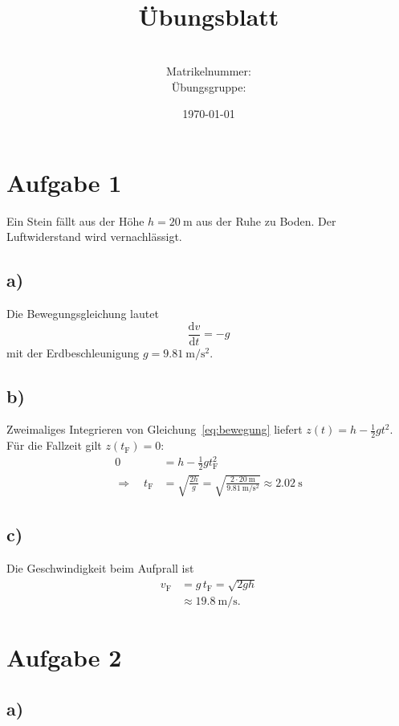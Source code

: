 \documentclass[a4paper,11pt]{article}
\title{\vorlesung\\[0.3em] \large Übungsblatt \blatt}
\author{\name \\ Matrikelnummer: \matrikel \\ Übungsgruppe: \gruppe}
\date{\today}
\newcommand{\diff}{\mathrm{d}}                    %
\newcommand{\abl}[2]{\frac{\diff #1}{\diff #2}}   %
\begin{document}
\maketitle
\thispagestyle{fancy}

\section*{Aufgabe 1}
Ein Stein fällt aus der Höhe $h = \qty{20}{\metre}$ aus der Ruhe zu Boden.
Der Luftwiderstand wird vernachlässigt.

\subsection*{a)}
Die Bewegungsgleichung lautet
\begin{equation}
  \abl{v}{t} = -g
  \label{eq:bewegung}
\end{equation}
mit der Erdbeschleunigung $g = \qty{9.81}{\metre\per\second\squared}$.

\subsection*{b)}
Zweimaliges Integrieren von Gleichung~\eqref{eq:bewegung} liefert
$z(t) = h - \frac{1}{2} g t^2$. Für die Fallzeit gilt $z(t_\text{F}) = 0$:
\begin{align}
  0 &= h - \frac{1}{2} g t_\text{F}^2 \\
  \Rightarrow \quad t_\text{F} &= \sqrt{\frac{2h}{g}}
    = \sqrt{\frac{2 \cdot \qty{20}{\metre}}{\qty{9.81}{\metre\per\second\squared}}}
    \approx \qty{2.02}{\second}
\end{align}

\subsection*{c)}
Die Geschwindigkeit beim Aufprall ist
\begin{align*}
  v_\text{F} &= g \, t_\text{F} = \sqrt{2 g h} \\
             &\approx \qty{19.8}{\metre\per\second}.
\end{align*}

\section*{Aufgabe 2}
\subsection*{a)}
\end{document}
